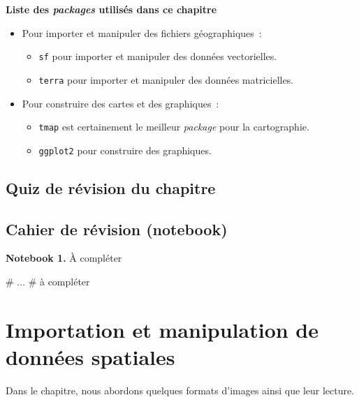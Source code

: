 \documentclass[
  letterpaper,
  DIV=11,
  numbers=noendperiod]{scrreprt}
\newenvironment{Shaded}{\begin{snugshade}}{\end{snugshade}}
\newcommand{\CommentTok}[1]{\textcolor[rgb]{0.37,0.37,0.37}{#1}}
\providecommand{\tightlist}{%
  \setlength{\itemsep}{0pt}\setlength{\parskip}{0pt}}\usepackage{longtable,booktabs,array}
\begin{document}
\textbf{Liste des \emph{packages} utilisés dans ce chapitre}

\begin{itemize}
\tightlist
\item
  Pour importer et manipuler des fichiers géographiques~:

  \begin{itemize}
  \tightlist
  \item
    \texttt{sf} pour importer et manipuler des données vectorielles.
  \item
    \texttt{terra} pour importer et manipuler des données matricielles.
  \end{itemize}
\item
  Pour construire des cartes et des graphiques~:

  \begin{itemize}
  \tightlist
  \item
    \texttt{tmap} est certainement le meilleur \emph{package} pour la
    cartographie.
  \item
    \texttt{ggplot2} pour construire des graphiques.
  \end{itemize}
\end{itemize}

\section{Quiz de révision du
chapitre}\label{quiz-de-ruxe9vision-du-chapitre}

\section{Cahier de révision (notebook)}\label{sec-016}

\textbf{Notebook 1.} À compléter

\begin{Shaded}
\begin{Highlighting}[]
\CommentTok{\# ...}
\CommentTok{\# à compléter}
\end{Highlighting}
\end{Shaded}


\chapter{Importation et manipulation de données
spatiales}\label{sec-chap01}

Dans le chapitre, nous abordons quelques formats d'images ainsi que leur
lecture.
\end{document}
